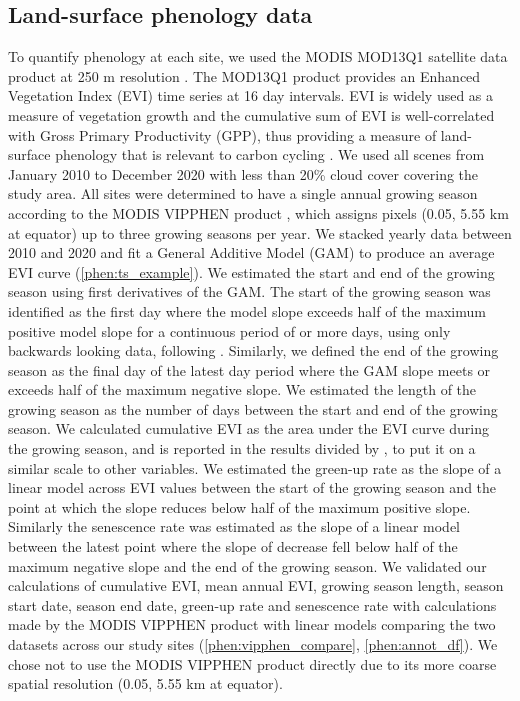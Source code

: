 \begin{refsection}
\subsection{Land-surface phenology data}
\label{phen:ssec:phen_data}

To quantify phenology at each site, we used the MODIS MOD13Q1 satellite data product at 250 m resolution \citep{MOD13Q1}. The MOD13Q1 product provides an Enhanced Vegetation Index (EVI) time series at 16 day intervals. EVI is widely used as a measure of vegetation growth and the cumulative sum of EVI is well-correlated with Gross Primary Productivity (GPP), thus providing a measure of land-surface phenology that is relevant to carbon cycling \citep{Sjostrom2011}. We used all scenes from January 2010 to December 2020 with less than 20\% cloud cover covering the study area. All sites were determined to have a single annual growing season according to the MODIS VIPPHEN product \citep{VIPPHEN}, which assigns pixels (0.05\textdegree, 5.55 km at equator) up to three growing seasons per year. We stacked yearly data between 2010 and 2020 and fit a General Additive Model (GAM) to produce an average EVI curve (\autoref{phen:ts_example}). We estimated the start and end of the growing season using first derivatives of the GAM. The start of the growing season was identified as the first day where the model slope exceeds half of the maximum positive model slope for a continuous period of \modisWin{} or more days, using only backwards looking data, following \citet{White2009}. Similarly, we defined the end of the growing season as the final day of the latest \trmmWin{} day period where the GAM slope meets or exceeds half of the maximum negative slope. We estimated the length of the growing season as the number of days between the start and end of the growing season. We calculated cumulative EVI as the area under the EVI curve during the growing season, and is reported in the results divided by \eviDiv{}, to put it on a similar scale to other variables. We estimated the green-up rate as the slope of a linear model across EVI values between the start of the growing season and the point at which the slope reduces below half of the maximum positive slope. Similarly the senescence rate was estimated as the slope of a linear model between the latest point where the slope of decrease fell below half of the maximum negative slope and the end of the growing season. We validated our calculations of cumulative EVI, mean annual EVI, growing season length, season start date, season end date, green-up rate and senescence rate with calculations made by the MODIS VIPPHEN product with linear models comparing the two datasets across our study sites (\autoref{phen:vipphen_compare}, \autoref{phen:annot_df}). We chose not to use the MODIS VIPPHEN product directly due to its more coarse spatial resolution (0.05\textdegree, 5.55 km at equator).


\end{refsection}

